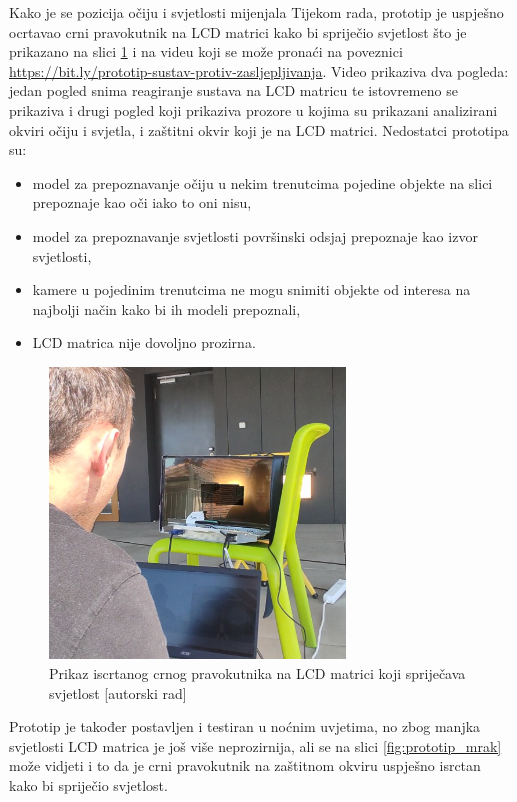 \documentclass{foi}
\begin{document}
\newpage
Kako je se pozicija očiju i svjetlosti mijenjala Tijekom rada, prototip je uspješno ocrtavao crni pravokutnik na LCD matrici kako bi spriječio svjetlost što je prikazano na slici \ref{fig:prototip_zastita} i na videu koji se može pronaći na poveznici \url{https://bit.ly/prototip-sustav-protiv-zasljepljivanja}. Video prikaziva dva pogleda: jedan pogled snima reagiranje sustava na LCD matricu te istovremeno se prikaziva i drugi pogled koji prikaziva prozore u kojima su prikazani analizirani okviri očiju i svjetla, i zaštitni okvir koji je na LCD matrici. Nedostatci prototipa su:
\begin{itemize}[noitemsep]
    \item model za prepoznavanje očiju u nekim trenutcima pojedine objekte na slici prepoznaje kao oči iako to oni nisu,
    \item model za prepoznavanje svjetlosti površinski odsjaj prepoznaje kao izvor svjetlosti,
    \item kamere u pojedinim trenutcima ne mogu snimiti objekte od interesa na najbolji način kako bi ih modeli prepoznali,
    \item LCD matrica nije dovoljno prozirna.
\end{itemize}

\begin{figure}[h!]
    \centering
    \includegraphics[width=0.7\textwidth]{slike/prototip_zastita}
    \caption{Prikaz iscrtanog crnog pravokutnika na LCD matrici koji spriječava svjetlost [autorski rad]}
    \label{fig:prototip_zastita}
\end{figure}

\newpage
Prototip je također postavljen i testiran u noćnim uvjetima, no zbog manjka svjetlosti LCD matrica je još više neprozirnija, ali se na slici \ref{fig:prototip_mrak} može vidjeti i to da je crni pravokutnik na zaštitnom okviru uspješno isrctan kako bi spriječio svjetlost.
\end{document}
